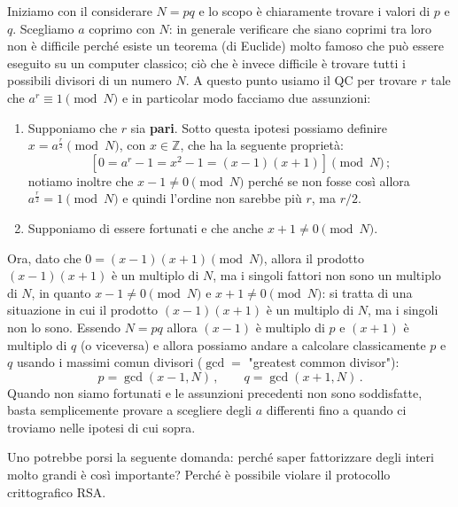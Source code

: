 \noindent Iniziamo con il considerare $N=pq$ e lo scopo è chiaramente trovare i valori di $p$ e $q$. Scegliamo $a$ coprimo con $N$: in generale verificare che siano coprimi tra loro non è difficile perché esiste un teorema (di Euclide) molto famoso che può essere eseguito su un computer classico; ciò che è invece difficile è trovare tutti i possibili divisori di un numero $N$. A questo punto usiamo il QC per trovare $r$ tale che $a^r\equiv1 \pmod N$ e in particolar modo facciamo due assunzioni:
\begin{enumerate}
    \item Supponiamo che $r$ sia \textbf{pari}. Sotto questa ipotesi possiamo definire $x=a^{\frac r2}\pmod N$, con $x \in \mathbb{Z}$, che ha la seguente proprietà:
        \begin{equation*}
            \left[ 0 =a^r-1 = x^2-1=(x-1)(x+1) \right] \pmod N \, ;
        \end{equation*}
        notiamo inoltre che $x-1\neq 0\pmod N$ perché se non fosse così allora $a^\frac r2 =1 \pmod N$ e quindi l'ordine non sarebbe più $r$, ma $r/2$.
    \item Supponiamo di essere fortunati e che anche $x+1\neq 0 \pmod N$.
\end{enumerate}
Ora, dato che $0 = (x-1)(x+1) \pmod N$, allora il prodotto $(x-1)(x+1)$ è un multiplo di $N$, ma i singoli fattori non sono un multiplo di $N$, in quanto $x-1 \neq 0 \pmod N$ e $x+1  \neq 0 \pmod N$: si tratta di una situazione in cui il prodotto $(x-1)(x+1)$ è un multiplo di $N$, ma i singoli non lo sono. Essendo $N = pq$ allora $(x-1)$ è multiplo di $p$ e $(x+1)$ è multiplo di $q$ (o viceversa) e allora possiamo andare a calcolare classicamente $p$ e $q$ usando i massimi comun divisori ($\gcd = $ "greatest common divisor"): 
\begin{equation*}
    p=\gcd{(x-1,N)} \, , \qquad q=\gcd{(x+1,N)} \, .
\end{equation*}
Quando non siamo fortunati e le assunzioni precedenti non sono soddisfatte, basta semplicemente provare a scegliere degli $a$ differenti fino a quando ci troviamo nelle ipotesi di cui sopra. 

\noindent Uno potrebbe porsi la seguente domanda: perché saper fattorizzare degli interi molto grandi è così importante? Perché è possibile violare il protocollo crittografico RSA. 


